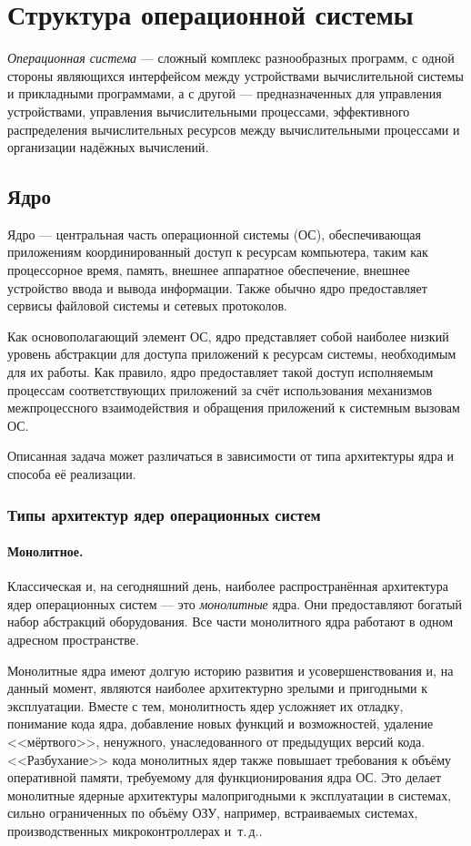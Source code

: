 \section{Структура операционной системы}\label{base:os:structure}
\emph{Операционная система} --- сложный комплекс разнообразных программ, с одной стороны являющихся интерфейсом между устройствами вычислительной системы и прикладными программами, а с другой --- предназначенных для управления устройствами, управления вычислительными процессами, эффективного распределения вычислительных ресурсов между вычислительными процессами и организации надёжных вычислений.

\subsection{Ядро}\label{base:os:structure:kernel}
Ядро --- центральная часть операционной системы (ОС), обеспечивающая приложениям координированный доступ к ресурсам компьютера, таким как процессорное время, память, внешнее аппаратное обеспечение, внешнее устройство ввода и вывода информации. Также обычно ядро предоставляет сервисы файловой системы и сетевых протоколов.

Как основополагающий элемент ОС, ядро представляет собой наиболее низкий уровень абстракции для доступа приложений к ресурсам системы, необходимым для их работы. Как правило, ядро предоставляет такой доступ исполняемым процессам соответствующих приложений за счёт использования механизмов межпроцессного взаимодействия и обращения приложений к системным вызовам ОС.

Описанная задача может различаться в зависимости от типа архитектуры ядра и способа её реализации.

\subsubsection{Типы архитектур ядер операционных систем}\label{base:os:structure:kernel:types}
\paragraph{Монолитное.} Классическая и, на сегодняшний день, наиболее распространённая архитектура ядер операционных систем --- это \emph{монолитные} ядра. Они предоставляют богатый набор абстракций оборудования. Все части монолитного ядра работают в одном адресном пространстве.

Монолитные ядра имеют долгую историю развития и усовершенствования и, на данный момент, являются наиболее архитектурно зрелыми и пригодными к эксплуатации. Вместе с тем, монолитность ядер усложняет их отладку, понимание кода ядра, добавление новых функций и возможностей, удаление <<мёртвого>>, ненужного, унаследованного от предыдущих версий кода. <<Разбухание>> кода монолитных ядер также повышает требования к объёму оперативной памяти, требуемому для функционирования ядра ОС. Это делает монолитные ядерные архитектуры малопригодными к эксплуатации в системах, сильно ограниченных по объёму ОЗУ, например, встраиваемых системах, производственных микроконтроллерах и~т.\,д..

